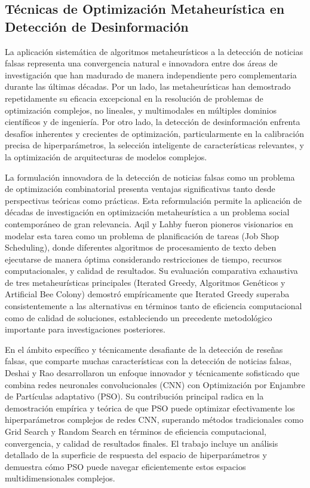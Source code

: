 \subsection{Técnicas de Optimización Metaheurística en Detección de Desinformación}

La aplicación sistemática de algoritmos metaheurísticos a la detección de noticias falsas representa una convergencia natural e innovadora entre dos áreas de investigación que han madurado de manera independiente pero complementaria durante las últimas décadas. Por un lado, las metaheurísticas han demostrado repetidamente su eficacia excepcional en la resolución de problemas de optimización complejos, no lineales, y multimodales en múltiples dominios científicos y de ingeniería. Por otro lado, la detección de desinformación enfrenta desafíos inherentes y crecientes de optimización, particularmente en la calibración precisa de hiperparámetros, la selección inteligente de características relevantes, y la optimización de arquitecturas de modelos complejos.

La formulación innovadora de la detección de noticias falsas como un problema de optimización combinatorial presenta ventajas significativas tanto desde perspectivas teóricas como prácticas. Esta reformulación permite la aplicación de décadas de investigación en optimización metaheurística a un problema social contemporáneo de gran relevancia. Aqil y Lahby \cite{aqil2021modeling} fueron pioneros visionarios en modelar esta tarea como un problema de planificación de tareas (Job Shop Scheduling), donde diferentes algoritmos de procesamiento de texto deben ejecutarse de manera óptima considerando restricciones de tiempo, recursos computacionales, y calidad de resultados. Su evaluación comparativa exhaustiva de tres metaheurísticas principales (Iterated Greedy, Algoritmos Genéticos y Artificial Bee Colony) demostró empíricamente que Iterated Greedy superaba consistentemente a las alternativas en términos tanto de eficiencia computacional como de calidad de soluciones, estableciendo un precedente metodológico importante para investigaciones posteriores.

En el ámbito específico y técnicamente desafiante de la detección de reseñas falsas, que comparte muchas características con la detección de noticias falsas, Deshai y Rao \cite{deshai2023unmasking} desarrollaron un enfoque innovador y técnicamente sofisticado que combina redes neuronales convolucionales (CNN) con Optimización por Enjambre de Partículas adaptativo (PSO). Su contribución principal radica en la demostración empírica y teórica de que PSO puede optimizar efectivamente los hiperparámetros complejos de redes CNN, superando métodos tradicionales como Grid Search y Random Search en términos de eficiencia computacional, convergencia, y calidad de resultados finales. El trabajo incluye un análisis detallado de la superficie de respuesta del espacio de hiperparámetros y demuestra cómo PSO puede navegar eficientemente estos espacios multidimensionales complejos.

